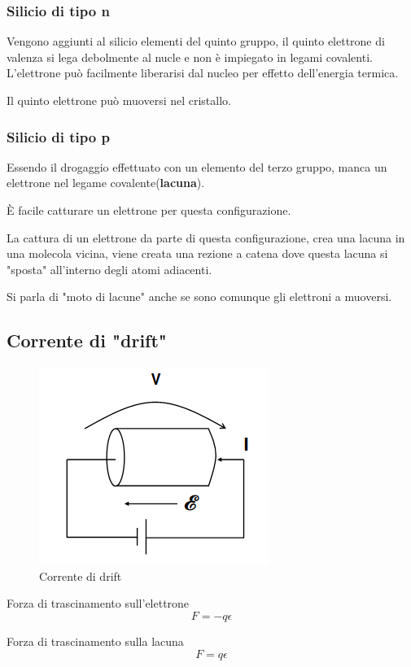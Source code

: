 \subsubsection{Silicio di tipo n}
Vengono aggiunti al silicio elementi del quinto gruppo, il quinto elettrone di valenza si lega debolmente al nucle
e non è impiegato in legami covalenti.
L'elettrone può facilmente liberarisi dal nucleo per effetto dell'energia termica.


Il quinto elettrone può muoversi nel cristallo.

\subsubsection{Silicio di tipo p}
Essendo il drogaggio effettuato con un elemento del terzo gruppo, manca un elettrone nel legame
covalente(\textbf{lacuna}).

È facile catturare un elettrone per questa configurazione.

La cattura di un elettrone da parte di questa configurazione, crea una lacuna in una molecola vicina,
viene creata una rezione a catena dove questa lacuna si "sposta" all'interno degli atomi adiacenti.

Si parla di "moto di lacune" anche se sono comunque gli elettroni a muoversi.

\subsection{Corrente di "drift"}
\begin{figure}[H]
    \centering
    \includegraphics[width=0.3\linewidth]{imgs/corrente-di-drift}
    \caption{Corrente di drift}
    \label{fig:corrente_drift}
\end{figure}
Forza di trascinamento sull'elettrone
\begin{equation*}
    F = -q \epsilon
\end{equation*}

Forza di trascinamento sulla lacuna
\begin{equation*}
    F = q \epsilon
\end{equation*}

